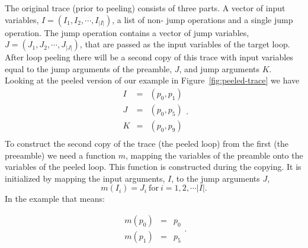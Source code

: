\documentclass[preprint]{sigplanconf}
\begin{document}
The original trace (prior to peeling) consists of three parts.
A vector of input
variables, $I=\left(I_1, I_2, \cdots, I_{|I|}\right)$, a list of non-
jump operations and a single
jump operation. The jump operation contains a vector of jump variables,
$J=\left(J_1, J_2, \cdots, J_{|J|}\right)$, that are passed as the input variables of the target loop. After
loop peeling there will be a second copy of this trace with input
variables equal to the jump arguments of the preamble, $J$, and jump
arguments $K$. Looking  at the peeled version of our example in Figure~\ref{fig:peeled-trace} we have
\begin{equation}
    \begin{array}{lcl}
      I &=& \left( p_0, p_1 \right) \\
      J &=& \left( p_0, p_5 \right) \\
      K &=& \left( p_0, p_9 \right) \\
    \end{array}
  .
\end{equation}
To construct the second copy of the trace (the peeled loop) from the
first (the preeamble) we need a
function $m$, mapping the variables of the preamble onto the
variables of the peeled loop. This function is constructed during the
copying. It is initialized by mapping the input arguments, $I$, to
the jump arguments $J$,
\begin{equation}
  m\left(I_i\right) = J_i \ \text{for}\ i = 1, 2, \cdots |I| .
\end{equation}
In the example that means:

\begin{equation}
    \begin{array}{lcl}
      m\left(p_0\right) &=& p_0 \\
      m\left(p_1\right) &=& p_5
    \end{array}
  .
\end{equation}
\end{document}
